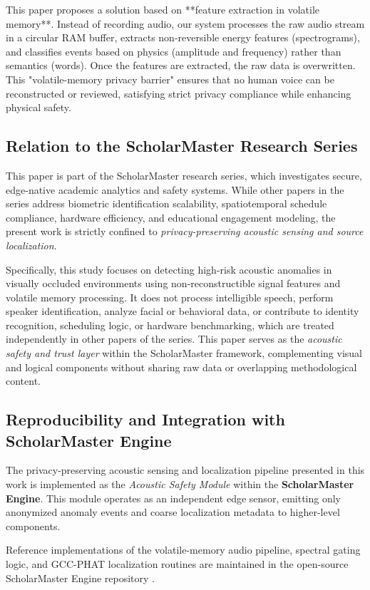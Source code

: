 \documentclass[conference]{IEEEtran}
\begin{document}
This paper proposes a solution based on **feature extraction in volatile memory**. Instead of recording audio, our system processes the raw audio stream in a circular RAM buffer, extracts non-reversible energy features (spectrograms), and classifies events based on physics (amplitude and frequency) rather than semantics (words). Once the features are extracted, the raw data is overwritten. This "volatile-memory privacy barrier" ensures that no human voice can be reconstructed or reviewed, satisfying strict privacy compliance while enhancing physical safety.

\subsection{Relation to the ScholarMaster Research Series}
This paper is part of the ScholarMaster research series, which investigates secure, edge-native academic analytics and safety systems. While other papers in the series address biometric identification scalability, spatiotemporal schedule compliance, hardware efficiency, and educational engagement modeling, the present work is strictly confined to \textit{privacy-preserving acoustic sensing and source localization}.

Specifically, this study focuses on detecting high-risk acoustic anomalies in visually occluded environments using non-reconstructible signal features and volatile memory processing. It does not process intelligible speech, perform speaker identification, analyze facial or behavioral data, or contribute to identity recognition, scheduling logic, or hardware benchmarking, which are treated independently in other papers of the series. This paper serves as the \textit{acoustic safety and trust layer} within the ScholarMaster framework, complementing visual and logical components without sharing raw data or overlapping methodological content.

\subsection{Reproducibility and Integration with ScholarMaster Engine}
The privacy-preserving acoustic sensing and localization pipeline presented in this work is implemented as the \textit{Acoustic Safety Module} within the \textbf{ScholarMaster Engine}. This module operates as an independent edge sensor, emitting only anonymized anomaly events and coarse localization metadata to higher-level components.

Reference implementations of the volatile-memory audio pipeline, spectral gating logic, and GCC-PHAT localization routines are maintained in the open-source ScholarMaster Engine repository \cite{scholarmaster_repo}.
\end{document}
